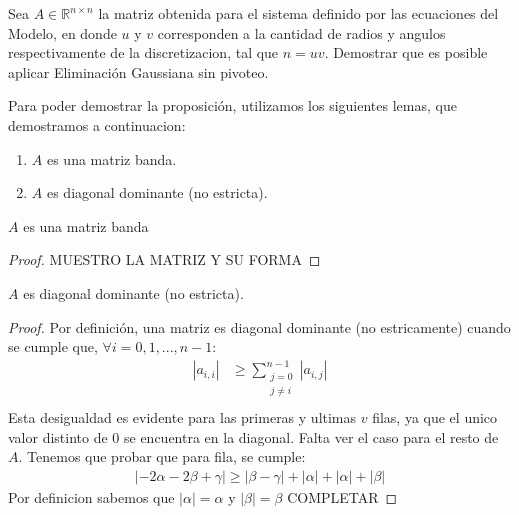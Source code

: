 \begin{proposition}
    Sea $A \in \mathbb{R}^{n \times n}$ la matriz obtenida para el sistema definido por las ecuaciones del Modelo, en donde $u$ y $v$ corresponden a la cantidad de radios y angulos respectivamente de la discretizacion, tal que $n = uv$. Demostrar que es posible aplicar Eliminación Gaussiana sin pivoteo.
\end{proposition}
Para poder demostrar la proposición, utilizamos los siguientes lemas, que demostramos a continuacion:

  \begin{enumerate}[label=(\subscript{L}{\arabic*})]
    \item $A$ es una matriz banda.
    \item $A$ es diagonal dominante (no estricta).
  \end{enumerate}


  \begin{lemma}
    $A$ es una matriz banda
  \end{lemma}

  \begin{proof}
    MUESTRO LA MATRIZ Y SU FORMA
  \end{proof}

  \begin{lemma}
    $A$ es diagonal dominante (no estricta).
  \end{lemma}

  \begin{proof}
    Por definición, una matriz es diagonal dominante (no estricamente) cuando se cumple que, $\forall i = 0,1,...,n-1$:
    \begin{equation*}
        \begin{aligned}
          |a_{i,i}| &\geq \sum\limits_{\substack{j=0  \\ j \neq i}}^{n-1} |a_{i,j}| \\
        \end{aligned}
    \end{equation*}
    Esta desigualdad es evidente para las primeras  y ultimas $v$ filas, ya que el unico valor distinto de 0 se encuentra en la diagonal.
    Falta ver el caso para el resto de $A$. Tenemos que probar que para fila, se cumple:
    \begin{equation*}
        \begin{aligned}
          |-2\alpha-2\beta+\gamma| \geq |\beta - \gamma| + |\alpha| + |\alpha| + |\beta|
        \end{aligned}
    \end{equation*}
    Por definicion sabemos que $|\alpha| = \alpha$ y $|\beta| = \beta$
    \newline
    COMPLETAR
  \end{proof}

